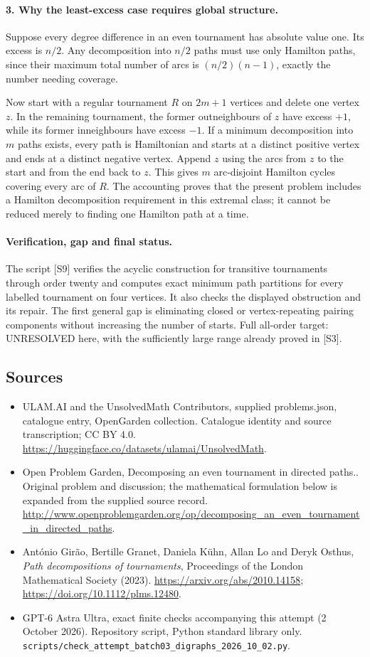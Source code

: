 \documentclass[11pt,a4paper]{article}
\begin{document}
\paragraph{3. Why the least-excess case requires global structure.}
Suppose every degree difference in an even tournament has absolute
value one. Its excess is $n/2$. Any decomposition into $n/2$ paths
must use only Hamilton paths, since their maximum total number of
arcs is $(n/2)(n-1)$, exactly the number needing coverage.

Now start with a regular tournament $R$ on $2m+1$ vertices and delete
one vertex $z$. In the remaining tournament, the former outneighbours
of $z$ have excess $+1$, while its former inneighbours have excess
$-1$. If a minimum decomposition into $m$ paths exists, every path
is Hamiltonian and starts at a distinct positive vertex and ends at
a distinct negative vertex. Append $z$ using the arcs from $z$ to
the start and from the end back to $z$. This gives $m$ arc-disjoint
Hamilton cycles covering every arc of $R$. The accounting proves
that the present problem includes a Hamilton decomposition requirement
in this extremal class; it cannot be reduced merely to finding one
Hamilton path at a time.

\paragraph{Verification, gap and final status.}
The script [S9] verifies the acyclic construction for transitive
tournaments through order twenty and computes exact minimum path
partitions for every labelled tournament on four vertices. It also
checks the displayed obstruction and its repair. The first general
gap is eliminating closed or vertex-repeating pairing components
without increasing the number of starts. Full all-order target:
UNRESOLVED here, with the sufficiently large range already proved
in [S3].
\subsection{Sources}
\begin{itemize}
\item[S1] ULAM.AI and the UnsolvedMath Contributors, supplied problems.json, catalogue entry, OpenGarden collection. Catalogue identity and source transcription; CC BY 4.0.
\url{https://huggingface.co/datasets/ulamai/UnsolvedMath}.
\item[S2] Open Problem Garden, Decomposing an even tournament in directed paths.. Original problem and discussion; the mathematical formulation below is expanded from the supplied source record.
\url{http://www.openproblemgarden.org/op/decomposing_an_even_tournament_in_directed_paths}.
\item[S3] Ant\'onio Gir\~ao, Bertille Granet, Daniela K\"uhn, Allan Lo and Deryk Osthus, \emph{Path decompositions of tournaments}, Proceedings of the London Mathematical Society (2023). \url{https://arxiv.org/abs/2010.14158}; \url{https://doi.org/10.1112/plms.12480}.
\item[S9] GPT-6 Astra Ultra, exact finite checks accompanying this attempt (2 October 2026). Repository script, Python standard library only. \texttt{scripts/check\_attempt\_batch03\_digraphs\_2026\_10\_02.py}.
\end{itemize}
\end{document}
